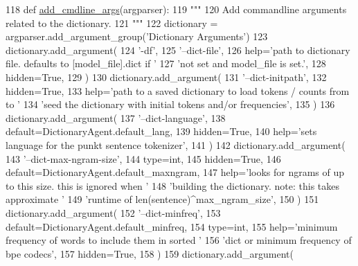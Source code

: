 \begin{DoxyCode}
118     \textcolor{keyword}{def }\hyperlink{namespaceparlai_1_1agents_1_1drqa_1_1config_a62fdd5554f1da6be0cba185271058320}{add\_cmdline\_args}(argparser):
119         \textcolor{stringliteral}{"""}
120 \textcolor{stringliteral}{        Add commandline arguments related to the dictionary.}
121 \textcolor{stringliteral}{        """}
122         dictionary = argparser.add\_argument\_group(\textcolor{stringliteral}{'Dictionary Arguments'})
123         dictionary.add\_argument(
124             \textcolor{stringliteral}{'-df'},
125             \textcolor{stringliteral}{'--dict-file'},
126             help=\textcolor{stringliteral}{'path to dictionary file. defaults to [model\_file].dict if '}
127             \textcolor{stringliteral}{'not set and model\_file is set.'},
128             hidden=\textcolor{keyword}{True},
129         )
130         dictionary.add\_argument(
131             \textcolor{stringliteral}{'--dict-initpath'},
132             hidden=\textcolor{keyword}{True},
133             help=\textcolor{stringliteral}{'path to a saved dictionary to load tokens / counts from to '}
134             \textcolor{stringliteral}{'seed the dictionary with initial tokens and/or frequencies'},
135         )
136         dictionary.add\_argument(
137             \textcolor{stringliteral}{'--dict-language'},
138             default=DictionaryAgent.default\_lang,
139             hidden=\textcolor{keyword}{True},
140             help=\textcolor{stringliteral}{'sets language for the punkt sentence tokenizer'},
141         )
142         dictionary.add\_argument(
143             \textcolor{stringliteral}{'--dict-max-ngram-size'},
144             type=int,
145             hidden=\textcolor{keyword}{True},
146             default=DictionaryAgent.default\_maxngram,
147             help=\textcolor{stringliteral}{'looks for ngrams of up to this size. this is ignored when '}
148             \textcolor{stringliteral}{'building the dictionary. note: this takes approximate '}
149             \textcolor{stringliteral}{'runtime of len(sentence)^max\_ngram\_size'},
150         )
151         dictionary.add\_argument(
152             \textcolor{stringliteral}{'--dict-minfreq'},
153             default=DictionaryAgent.default\_minfreq,
154             type=int,
155             help=\textcolor{stringliteral}{'minimum frequency of words to include them in sorted '}
156             \textcolor{stringliteral}{'dict or minimum frequency of bpe codecs'},
157             hidden=\textcolor{keyword}{True},
158         )
159         dictionary.add\_argument(

\end{DoxyCode}
